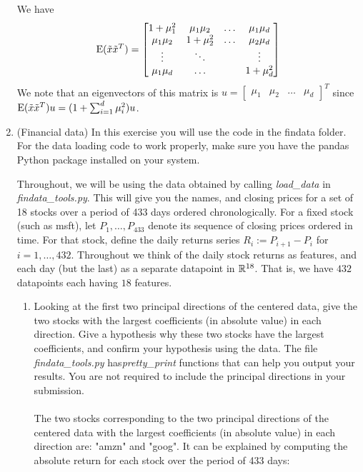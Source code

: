 \documentclass[12pt,twoside]{article}
\begin{document}
\begin{enumerate}
We have
  \begin{align*}
  		\mathrm{E}(\tilde{  x } \tilde{  x }^T) =
	   \begin{bmatrix}
	   		1+ \mu_1^2	& 	\mu_1 \mu_2	&	\ldots	& 	\mu_1 \mu_d	\\
			\mu_1 \mu_2	&	1+ \mu_2^2	&	\ldots	& 	\mu_2 \mu_d	\\
			\vdots		&	\ddots		&			& 	\vdots		\\
			\mu_1 \mu_d	&	\ldots		&			&	1 + \mu_d^2	
	   \end{bmatrix}
  \end{align*}
  We note that an eigenvectors of this matrix is
   $u = \begin{bmatrix}
  	\mu_1	& \mu_2	& \ldots	& \mu_d
  \end{bmatrix}^T$ since $\mathrm{E}(\tilde{  x } \tilde{  x }^T) u = (1 + \sum_{i=1}^d \mu_i^2) u$.
    	
 \newpage
  
 \item (Financial data) In this exercise you will use the code in the findata folder.
  For the data loading code to work properly, make sure you
  have the pandas Python package installed on your system.

  Throughout, we will be using the data obtained by calling
 \emph{load\_data} in \emph{findata\_tools.py}.  This will
  give you the names, and closing prices for a set of 18 stocks over a
  period of 433 days ordered chronologically.
  For a fixed stock (such as msft), let
  $P_1,\ldots,P_{433}$ denote its sequence of closing prices ordered in
  time.  For that stock, define the daily returns series $R_i:=P_{i+1}-P_i$ for
  $i=1,\ldots,432$.  Throughout we think of the daily stock returns as features,
  and each day (but the last) as a separate datapoint in $\mathbb{R}^{18}$.
  That is, we have $432$ datapoints each having $18$ features.
  \begin{enumerate}
  \item Looking at the first two principal directions of the
    centered data, give the two stocks with the largest
    coefficients (in absolute value) in each direction.  
    Give a hypothesis why these two stocks have the largest
    coefficients, and confirm your hypothesis using the data.  The file 
   \emph{findata\_tools.py} has\emph{pretty\_print}
    functions that can help you output your results.
    You are not required to include the principal directions in
    your submission.\\ \\
    The two stocks corresponding to the two principal directions of the centered data with the largest coefficients (in absolute value) in each direction
    are: "amzn" and  "goog". It can be explained by computing the absolute return for each stock over the period of 433 days:


\end{enumerate}
\end{enumerate}
\end{document}
